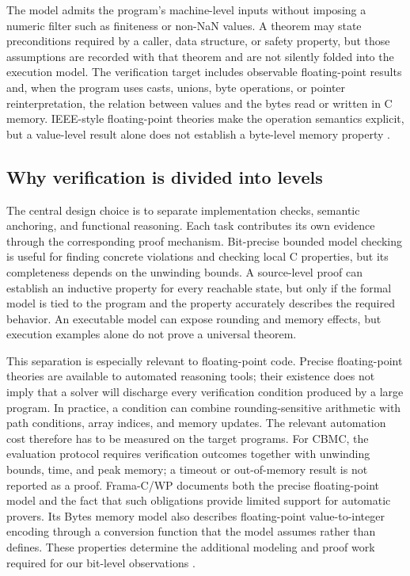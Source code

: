 \documentclass[manuscript, screen, review]{acmart}
\begin{document}
The model admits the program's machine-level inputs without imposing a
numeric filter such as finiteness or non-NaN values. A theorem may state
preconditions required by a caller, data structure, or safety property, but
those assumptions are recorded with that theorem and are not silently
folded into the execution model. The verification target includes observable
floating-point results and, when the program uses casts, unions, byte
operations, or pointer reinterpretation, the relation between values and
the bytes read or written in C memory. IEEE-style floating-point theories
make the operation semantics explicit, but a value-level result alone does
not establish a byte-level memory property \cite{Brain2015}.

\subsection{Why verification is divided into levels}

The central design choice is to separate implementation checks, semantic
anchoring, and functional reasoning. Each task contributes its own evidence through the corresponding proof mechanism. Bit-precise bounded model checking is useful for finding concrete
violations and checking local C properties, but its completeness depends on
the unwinding bounds. A source-level proof can establish an inductive
property for every reachable state, but only if the formal model is tied to
the program and the property accurately describes the required behavior.
An executable model can expose rounding and memory effects, but execution
examples alone do not prove a universal theorem.

This separation is especially relevant to floating-point code. Precise
floating-point theories are available to automated reasoning tools; their
existence does not imply that a solver will discharge every verification
condition produced by a large program. In practice, a condition can combine
rounding-sensitive arithmetic with path conditions, array indices, and
memory updates. The relevant automation cost therefore has to be measured
on the target programs. For CBMC, the evaluation protocol requires verification
outcomes together with unwinding bounds, time, and peak memory; a timeout or
out-of-memory result is not reported as a proof. Frama-C/WP documents both
the precise floating-point model and the fact that such obligations provide
limited support for automatic provers. Its Bytes memory model also
describes floating-point value-to-integer encoding through a conversion
function that the model assumes rather than defines. These properties determine the additional modeling and proof work
required for our bit-level observations \cite{FramaCWPManual}.
\end{document}
